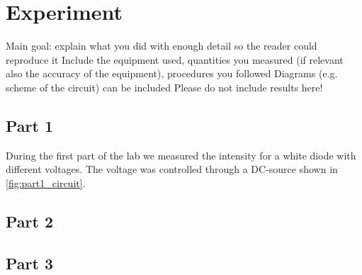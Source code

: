 \section{Experiment}

Main goal: explain what you did with enough detail so the reader could reproduce it
Include the equipment used, quantities you measured (if relevant also the accuracy of the
equipment), procedures you followed
Diagrams (e.g. scheme of the circuit) can be included
Please do not include results here!




\subsection{Part 1}
During the first part of the lab we measured the intensity for a white diode with different voltages. The voltage was controlled through a DC-source shown in \autoref{fig:part1_circuit}. 






    
\subsection{Part 2}




\subsection{Part 3}





